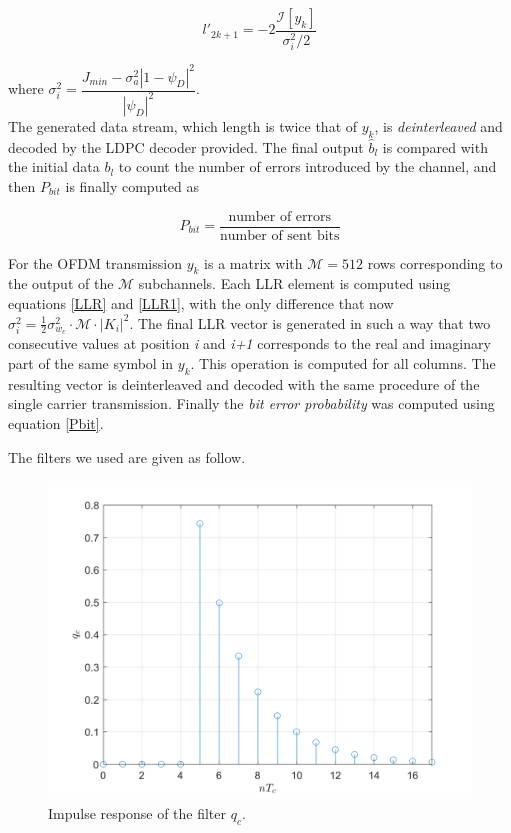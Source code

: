 \documentclass[a4paper, 12pt]{report}
\begin{document}
\begin{equation}\label{LLR1}
l'_{2k+1} = -2\dfrac{\mathcal{I}[y_k]}{\sigma_i^2/2}
\end{equation}

where $\sigma_i^2 = \dfrac{J_{min}-\sigma_a^2 |1-\psi_D|^2}{|\psi_D|^2}$. \\ 
The generated data stream, which length is twice that of $y_k$, is \textit{deinterleaved} and decoded by the LDPC decoder provided. The final output $\hat{b}_l$ is compared with the initial data $b_l$ to count the number of errors introduced by the channel, and then $P_{bit}$ is finally computed as 

\begin{equation}\label{Pbit}
P_{bit} = \frac{\text{number of errors}}{\text{number of sent bits}}
\end{equation}

For the OFDM transmission $y_k$ is a matrix with $\mathcal{M}=512$ rows corresponding to the output of the $\mathcal{M}$ subchannels. Each LLR element is computed using equations \eqref{LLR} and \eqref{LLR1}, with the only difference that now $\sigma_i^2 = \frac{1}{2}\sigma_{w_c}^2 \cdot \mathcal{M} \cdot |K_i|^2 $. The final LLR vector is generated in such a way that two consecutive values at position \textit{i} and \textit{i+1} corresponds to the real and imaginary part of the same symbol in $y_k$. This operation is computed for all columns. The resulting vector is deinterleaved and decoded with the same procedure of the single carrier transmission. Finally the \textit{bit error probability} was computed using equation \eqref{Pbit}.

\clearpage
The filters we used are given as follow.

\begin{figure}[H]
	\centering
	\includegraphics[width=14cm]{qc}
	\caption{Impulse response of the filter $q_c$.}\label{qc}
\end{figure}
\end{document}
